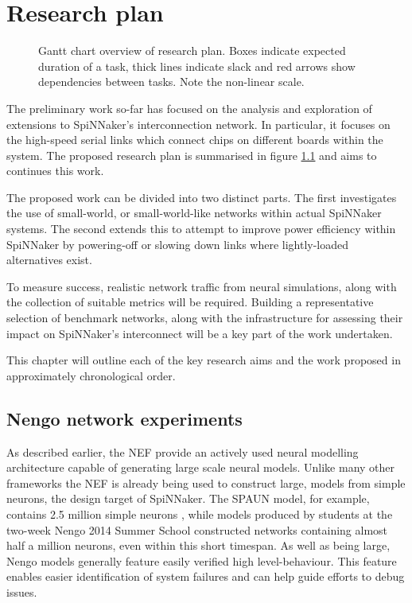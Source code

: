 \chapter{Research plan}
	\label{sec:research-plan}
	
	\begin{figure}[b!]
		\center
		
		\caption[Gantt chart overview of research plan.]{Gantt chart overview of
		research plan. Boxes indicate expected duration of a task, thick lines
		indicate slack and red arrows show dependencies between tasks. Note the
		non-linear scale.}
		\label{fig:plan-gantt}
	\end{figure}
	
	The preliminary work so-far has focused on the analysis and exploration of
	extensions to SpiNNaker's interconnection network. In particular, it focuses
	on the high-speed serial links which connect chips on different boards within
	the system. The proposed research plan is summarised in figure
	\ref{fig:plan-gantt} and aims to continues this work.
	
	The proposed work can be divided into two distinct parts. The first
	investigates the use of small-world, or small-world-like networks within
	actual SpiNNaker systems. The second extends this to attempt to improve power
	efficiency within SpiNNaker by powering-off or slowing down links where
	lightly-loaded alternatives exist.
	
	To measure success, realistic network traffic from neural simulations, along
	with the collection of suitable metrics will be required. Building a
	representative selection of benchmark networks, along with the infrastructure
	for assessing their impact on SpiNNaker's interconnect will be a key part of
	the work undertaken.
	
	This chapter will outline each of the key research aims and the work proposed
	in approximately chronological order.
	
	\section{Nengo network experiments}
		
		As described earlier, the NEF provide an actively used neural modelling
		architecture capable of generating large scale neural models. Unlike many
		other frameworks the NEF is already being used to construct large, models
		from simple neurons, the design target of SpiNNaker. The SPAUN model, for
		example, contains 2.5 million simple neurons \cite{eliasmith12}, while
		models produced by students at the two-week Nengo 2014 Summer School
		constructed networks containing almost half a million neurons, even within
		this short timespan. As well as being large, Nengo models generally feature
		easily verified high level-behaviour. This feature enables easier
		identification of system failures and can help guide efforts to debug
		issues.
		
